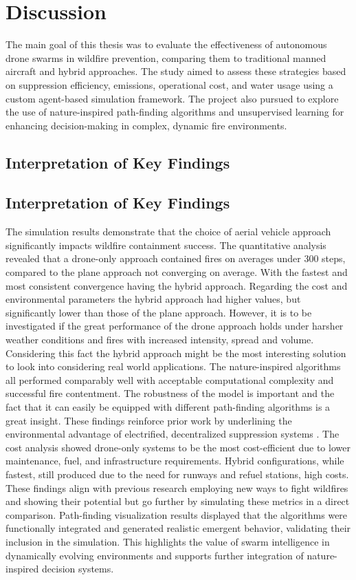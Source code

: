 \documentclass[11pt, a4paper]{article}
\begin{document}
\section{Discussion}
\label{sec:discussion}
The main goal of this thesis was to evaluate the effectiveness of autonomous drone swarms in wildfire prevention, comparing them to traditional manned aircraft and hybrid approaches. The study aimed to assess these strategies based on suppression efficiency, emissions, operational cost, and water usage using a custom agent-based simulation framework. The project also pursued to explore the use of nature-inspired path-finding algorithms and unsupervised learning for enhancing decision-making in complex, dynamic fire environments.

\subsection{Interpretation of Key Findings}

\subsection{Interpretation of Key Findings}
The simulation results demonstrate that the choice of aerial vehicle approach significantly impacts wildfire containment success. The quantitative analysis revealed that a drone-only approach contained fires on averages under 300 steps, compared to the plane approach not converging on average. With the fastest and most consistent convergence having the hybrid approach. 
Regarding the cost and environmental parameters the hybrid approach had higher values, but significantly lower than those of the plane approach. However, it is to be investigated if the great performance of the drone approach holds under harsher weather conditions and fires with increased intensity, spread and volume. Considering this fact the hybrid approach might be the most interesting solution to look into considering real world applications. The nature-inspired algorithms all performed comparably well with acceptable computational complexity and successful fire contentment. The robustness of the model is important and the fact that it can easily be equipped with different path-finding algorithms is a great insight. These findings reinforce prior work by underlining the environmental advantage of electrified, decentralized suppression systems \citep{Saffre2022,stolaroffEnergyUseLife2018}.
The cost analysis showed drone-only systems to be the most cost-efficient due to lower maintenance, fuel, and infrastructure requirements. Hybrid configurations, while fastest, still produced due to the need for runways and refuel stations, high costs. These findings align with previous research employing new ways to fight wildfires and showing their potential \citep{fireBalls} but go further by simulating these metrics in a direct comparison.
Path-finding visualization results displayed that the algorithms were functionally integrated and generated realistic emergent behavior, validating their inclusion in the simulation. This highlights the value of swarm intelligence in dynamically evolving environments and supports further integration of nature-inspired decision systems.
\end{document}
